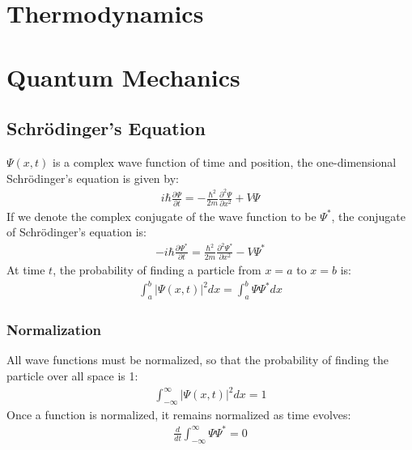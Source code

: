\documentclass[11pt]{article}
\newcommand{\cc}[1]{\ensuremath{#1^{\ast}}}			%
\newcommand{\pd}[2]{
\ensuremath{ \frac{\partial #1}{\partial #2} }}			%
\begin{document}
\begin{multicols*}{3}
\section{Thermodynamics}

\section{Quantum Mechanics}
\subsection{Schr\"{o}dinger's Equation}
$\Psi(x, t)$ is a complex wave function of time and position, the one-dimensional Schr\"{o}dinger's equation is given by:
	\begin{align*}
	i \hbar \pd{\Psi}{t} = - \frac{\hbar^2}{2m} \pd{^2 \Psi}{x^2} + V\Psi
	\end{align*}
If we denote the complex conjugate of the wave function to be $\cc{\Psi}$, the conjugate of Schr\"{o}dinger's equation is:
	\begin{align*}
	-i \hbar \pd{\cc{\Psi}}{t} = \frac{\hbar^2}{2m} \pd{^2 \cc{\Psi}}{x^2} - V\cc{\Psi}
	\end{align*}
At time $t$, the probability of finding a particle from $x=a$ to $x=b$ is:
	\begin{align*}
	\int_{a}^{b} |\Psi(x, t)|^2 dx = \int_{a}^{b}\Psi\cc{\Psi}dx
	\end{align*}
\subsubsection{Normalization}
All wave functions must be normalized, so that the probability of finding the particle over all space is 1:
	\begin{align*}
	\int_{-\infty}^{\infty} |\Psi(x,t)|^2 dx = 1
	\end{align*}
Once a function is normalized, it remains normalized as time evolves:
	\begin{align*}
	\frac{d}{dt} \int_{-\infty}^{\infty} \Psi \cc{\Psi} = 0
	\end{align*}

\end{multicols*}
\end{document}
